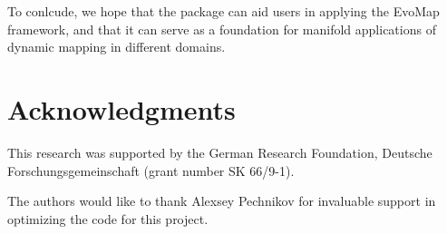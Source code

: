 \documentclass[article]{jss}
\begin{document}
To conlcude, we hope that the  package can aid users in applying the EvoMap framework, and that it can 
serve as a foundation for manifold applications of dynamic mapping in different domains.

\section*{Acknowledgments}

This research was supported by the German Research Foundation, Deutsche Forschungsgemeinschaft (grant number SK 66/9-1). 

The authors would like to thank Alexsey Pechnikov for invaluable support in optimizing the code for this project. 


\end{document}
